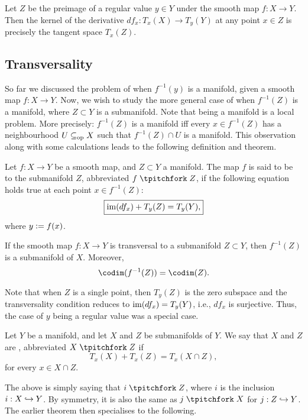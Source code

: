 \begin{prop}
	Let $Z$ be the preimage of a regular value $y \in Y$ under the smooth map $f : X \to Y$. Then the kernel of the derivative $df_{x} : T_{x}(X) \to T_{y}(Y)$ at any point $x \in Z$ is precisely the tangent space $T_{x}(Z)$.
\end{prop}

\subsection{Transversality}

So far we discussed the problem of when $f^{-1}(y)$ is a manifold, given a smooth map $f : X \to Y$. Now, we wish to study the more general case of when $f^{-1}(Z)$ is a manifold, where $Z \subset Y$ is a submanifold. Note that being a manifold is a local problem. More precisely: $f^{-1}(Z)$ is a manifold iff every $x \in f^{-1}(Z)$ has a neighbourhood $U \subseteq_{\operatorname{op}} X$ such that $f^{-1}(Z) \cap U$ is a manifold. This observation along with some calculations leads to the following definition and theorem.

\begin{defn}
	Let $f : X \to Y$ be a smooth map, and $Z \subset Y$ a manifold. The map $f$ is said to be  to the submanifold $Z$, abbreviated $f \trans Z$, if the following equation holds true at each point $x \in f^{-1}(Z)$:
	\begin{equation*} 
		\boxed{\operatorname{im}(df_{x}) + T_{y}(Z) = T_{y}(Y),}
	\end{equation*}
	where $y \vcentcolon= f(x)$.
\end{defn}

\begin{thm}
	If the smooth map $f : X \to Y$ is transversal to a submanifold $Z \subset Y$, then $f^{-1}(Z)$ is a submanifold of $X$. Moreover,
	\begin{equation*} 
		\codim(f^{-1}(Z)) = \codim(Z).
	\end{equation*}
\end{thm}

Note that when $Z$ is a single point, then $T_{y}(Z)$ is the zero subspace and the transversality condition reduces to $\operatorname{im}(df_{x}) = T_{y}(Y)$, i.e., $df_{x}$ is surjective. Thus, the case of $y$ being a regular value was a special case.

\begin{defn}
	Let $Y$ be a manifold, and let $X$ and $Z$ be submanifolds of $Y$. We say that $X$ and $Z$ are , abbreviated $X \trans Z$ if
	\begin{equation*} 
		\boxed{T_{x}(X) + T_{x}(Z) = T_{x}(X \cap Z),}
	\end{equation*}
	for every $x \in X \cap Z$.
\end{defn}
The above is simply saying that $i \trans Z$, where $i$ is the inclusion $i : X \hookrightarrow Y$. By symmetry, it is also the same as $j \trans X$ for $j : Z \hookrightarrow Y$. The earlier theorem then specialises to the following.

